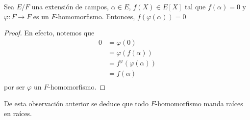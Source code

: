 \documentclass[12pt]{report}
\theoremstyle{largebreak}
\newcommand\cf[3]{\ensuremath{#1:#2\rightarrow#3}}
\begin{document}
    \begin{obs}
        Sea $E/F$ una extensión de campos, $\alpha\in E$, $f(X)\in E[X]$ tal que $f(\alpha)=0$ y $\cf{\varphi}{\overline{F}}{\overline{F}}$ es un $F$-homomorfismo. Entonces, $f(\varphi(\alpha))=0$
    \end{obs}

    \begin{proof}
        En efecto, notemos que
        \begin{equation*}
            \begin{split}
                0&=\varphi(0)\\
                &=\varphi(f(\alpha))\\
                &=f^{\varphi}(\varphi(\alpha))\\
                &=f(\alpha)\\
            \end{split}
        \end{equation*}
        por ser $\varphi$ un $F$-homomorfismo.
    \end{proof}

    De esta observación anterior se deduce que todo $F$-homomorfismo manda raíces en raíces.
\end{document}
